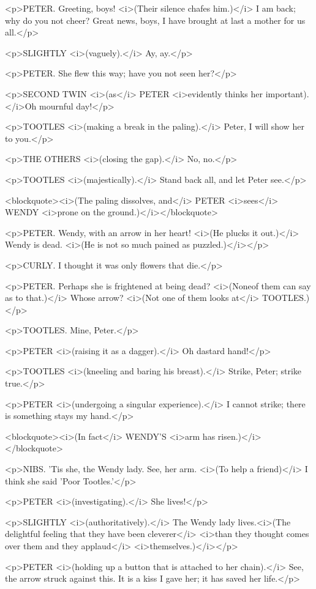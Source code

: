 <p>PETER. Greeting, boys! <i>(Their silence chafes him.)</i> I am
back; why do you not cheer? Great news, boys, I have brought at last
a mother for us all.</p>

<p>SLIGHTLY <i>(vaguely).</i> Ay, ay.</p>

<p>PETER. She flew this way; have you not seen her?</p>

<p>SECOND TWIN <i>(as</i> PETER <i>evidently thinks her
important).</i>Oh mournful day!</p>

<p>TOOTLES <i>(making a break in the paling).</i> Peter, I will show
her to you.</p>

<p>THE OTHERS <i>(closing the gap).</i> No, no.</p>

<p>TOOTLES <i>(majestically).</i> Stand back all, and let Peter
see.</p>

<blockquote><i>(The paling dissolves, and</i> PETER <i>sees</i> WENDY
<i>prone on the ground.)</i></blockquote>

<p>PETER. Wendy, with an arrow in her heart! <i>(He plucks it
out.)</i> Wendy is dead. <i>(He is not so much pained as
puzzled.)</i></p>

<p>CURLY. I thought it was only flowers that die.</p>

<p>PETER. Perhaps she is frightened at being dead? <i>(Noneof them
can say as to that.)</i> Whose arrow? <i>(Not one of them looks
at</i> TOOTLES.)</p>

<p>TOOTLES. Mine, Peter.</p>

<p>PETER <i>(raising it as a dagger).</i> Oh dastard hand!</p>

<p>TOOTLES <i>(kneeling and baring his breast).</i> Strike, Peter;
strike true.</p>

<p>PETER <i>(undergoing a singular experience).</i> I cannot strike;
there is something stays my hand.</p>

<blockquote><i>(In fact</i> WENDY'S <i>arm has
risen.)</i></blockquote>

<p>NIBS. 'Tis she, the Wendy lady. See, her arm. <i>(To help a
friend)</i> I think she said 'Poor Tootles.'</p>

<p>PETER <i>(investigating).</i> She lives!</p>

<p>SLIGHTLY <i>(authoritatively).</i> The Wendy lady lives.<i>(The
delightful feeling that they have been cleverer</i> <i>than they
thought comes over them and they applaud</i> <i>themselves.)</i></p>

<p>PETER <i>(holding up a button that is attached to her chain).</i>
See, the arrow struck against this. It is a kiss I gave her; it has
saved her life.</p>

